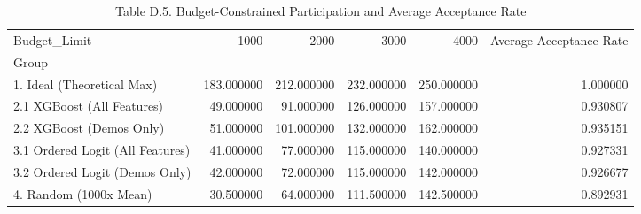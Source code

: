 \begin{table}
\caption{Table D.5. Budget-Constrained Participation and Average Acceptance Rate}
\begin{tabular}{lrrrrr}
\toprule
Budget_Limit & 1000 & 2000 & 3000 & 4000 & Average Acceptance Rate \\
Group &  &  &  &  &  \\
\midrule
1. Ideal (Theoretical Max) & 183.000000 & 212.000000 & 232.000000 & 250.000000 & 1.000000 \\
2.1 XGBoost (All Features) & 49.000000 & 91.000000 & 126.000000 & 157.000000 & 0.930807 \\
2.2 XGBoost (Demos Only) & 51.000000 & 101.000000 & 132.000000 & 162.000000 & 0.935151 \\
3.1 Ordered Logit (All Features) & 41.000000 & 77.000000 & 115.000000 & 140.000000 & 0.927331 \\
3.2 Ordered Logit (Demos Only) & 42.000000 & 72.000000 & 115.000000 & 142.000000 & 0.926677 \\
4. Random (1000x Mean) & 30.500000 & 64.000000 & 111.500000 & 142.500000 & 0.892931 \\
\bottomrule
\end{tabular}
\end{table}
